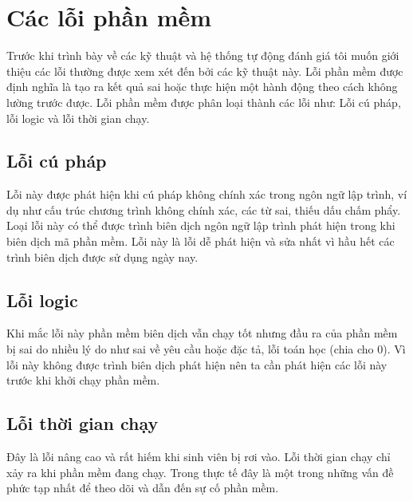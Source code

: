 \documentclass[12pt,a4paper]{article}
\begin{document}
\section{Các lỗi phần mềm}
Trước khi trình bày về các kỹ thuật và hệ thống tự động đánh giá tôi muốn giới thiệu các lỗi thường được xem xét đến bởi các kỹ thuật này. Lỗi phần mềm được định nghĩa là tạo ra kết quả sai hoặc thực hiện một hành động theo cách không lường trước được. Lỗi phần mềm được phân loại thành các lỗi như: Lỗi cú pháp, lỗi logic và lỗi thời gian chạy.\newline
\subsection{Lỗi cú pháp}
Lỗi này được phát hiện khi cú pháp không chính xác trong ngôn ngữ lập trình, ví dụ như cấu trúc chương trình không chính xác, các từ sai, thiếu dấu chấm phẩy. Loại lỗi này có thể được trình biên dịch ngôn ngữ lập trình phát hiện trong khi biên dịch mã phần mềm. Lỗi này là lỗi dễ phát hiện và sửa nhất vì hầu hết các trình biên dịch được sử dụng ngày nay.\newline
\subsection{Lỗi logic}
Khi mắc lỗi này phần mềm biên dịch vẫn chạy tốt nhưng đầu ra của phần mềm bị sai do nhiều lý do như sai về yêu cầu hoặc đặc tả, lỗi toán học (chia cho 0). Vì lỗi này không được trình biên dịch phát hiện nên ta cần phát hiện các lỗi này trước khi khởi chạy phần mềm.\newline
\subsection{Lỗi thời gian chạy}
Đây là lỗi nâng cao và rất hiếm khi sinh viên bị rơi vào. Lỗi thời gian chạy chỉ xảy ra khi phần mềm đang chạy. Trong thực tế đây là một trong những vấn đề phức tạp nhất để theo dõi và dẫn đến sự cố phần mềm.\newline
\end{document}
